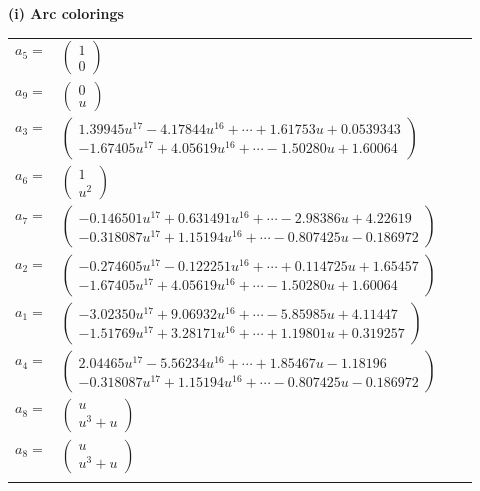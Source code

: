 \documentclass[1p]{elsarticle_modified}
\theoremstyle{definition}
\begin{document}
\flushleft \textbf{(i) Arc colorings}\\
\begin{tabular}{m{7pt} m{180pt} m{7pt} m{180pt} }
\flushright $a_{5}=$&$\begin{pmatrix}1\\0\end{pmatrix}$ \\
\flushright $a_{9}=$&$\begin{pmatrix}0\\u\end{pmatrix}$ \\
\flushright $a_{3}=$&$\begin{pmatrix}1.39945 u^{17}-4.17844 u^{16}+\cdots+1.61753 u+0.0539343\\-1.67405 u^{17}+4.05619 u^{16}+\cdots-1.50280 u+1.60064\end{pmatrix}$ \\
\flushright $a_{6}=$&$\begin{pmatrix}1\\u^2\end{pmatrix}$ \\
\flushright $a_{7}=$&$\begin{pmatrix}-0.146501 u^{17}+0.631491 u^{16}+\cdots-2.98386 u+4.22619\\-0.318087 u^{17}+1.15194 u^{16}+\cdots-0.807425 u-0.186972\end{pmatrix}$ \\
\flushright $a_{2}=$&$\begin{pmatrix}-0.274605 u^{17}-0.122251 u^{16}+\cdots+0.114725 u+1.65457\\-1.67405 u^{17}+4.05619 u^{16}+\cdots-1.50280 u+1.60064\end{pmatrix}$ \\
\flushright $a_{1}=$&$\begin{pmatrix}-3.02350 u^{17}+9.06932 u^{16}+\cdots-5.85985 u+4.11447\\-1.51769 u^{17}+3.28171 u^{16}+\cdots+1.19801 u+0.319257\end{pmatrix}$ \\
\flushright $a_{4}=$&$\begin{pmatrix}2.04465 u^{17}-5.56234 u^{16}+\cdots+1.85467 u-1.18196\\-0.318087 u^{17}+1.15194 u^{16}+\cdots-0.807425 u-0.186972\end{pmatrix}$ \\
\flushright $a_{8}=$&$\begin{pmatrix}u\\u^3+u\end{pmatrix}$\\ \flushright $a_{8}=$&$\begin{pmatrix}u\\u^3+u\end{pmatrix}$\\&\end{tabular}
\end{document}
